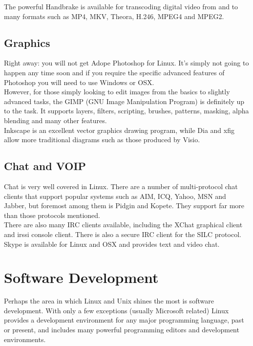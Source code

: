 The powerful Handbrake is available for transcoding digital video from and to many formats such as MP4, MKV, Theora, H.246, MPEG4 and MPEG2.

\subsection{Graphics}

Right away: you will not get Adope Photoshop for Linux.  It's simply not going to happen any time soon and if you require the specific advanced features of Photoshop you will need to use Windows or OSX.\\

However, for those simply looking to edit images from the basics to slightly advanced tasks, the GIMP (GNU Image Manipulation Program) is definitely up to the task.  It supports layers, filters, scripting, brushes, patterns, masking, alpha blending and many other features.\\

Inkscape is an excellent vector graphics drawing program, while Dia and xfig allow more traditional diagrams such as those produced by Visio.

\subsection{Chat and VOIP}

Chat is very well covered in Linux.  There are a number of multi-protocol chat clients that support popular systems such as AIM, ICQ, Yahoo, MSN and Jabber, but foremost among them is Pidgin and Kopete.  They support far more than those protocols mentioned.\\

There are also many IRC clients available, including the XChat graphical client and irssi console client.  There is also a secure IRC client for the SILC protocol.\\

Skype is available for Linux and OSX and provides text and video chat.

\section{Software Development}

Perhaps the area in which Linux and Unix shines the most is software development.  With only a few exceptions (usually Microsoft related) Linux provides a development environment for any major programming language, past or present, and includes many powerful programming editors and development environments.


